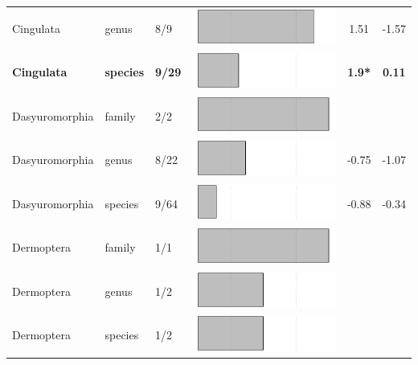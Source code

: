 \begin{longtable}{lL{1.8cm}C{2cm}lcc}
  Cingulata & genus & 8/9 & \includegraphics[width=0.20\linewidth, height=0.05\linewidth]{Results_1c/Table_figures/bar14.pdf} & 1.51 & -1.57 \\ 
  \textbf{Cingulata} & \textbf{species} & \textbf{9/29} & \includegraphics[width=0.20\linewidth, height=0.05\linewidth]{Results_1c/Table_figures/bar15.pdf} & \textbf{1.9*} & \textbf{0.11} \\ 
  Dasyuromorphia & family & 2/2 & \includegraphics[width=0.20\linewidth, height=0.05\linewidth]{Results_1c/Table_figures/bar16.pdf} &   &   \\ 
  Dasyuromorphia & genus & 8/22 & \includegraphics[width=0.20\linewidth, height=0.05\linewidth]{Results_1c/Table_figures/bar17.pdf} & -0.75 & -1.07 \\ 
  Dasyuromorphia & species & 9/64 & \includegraphics[width=0.20\linewidth, height=0.05\linewidth]{Results_1c/Table_figures/bar18.pdf} & -0.88 & -0.34 \\ 
  Dermoptera & family & 1/1 & \includegraphics[width=0.20\linewidth, height=0.05\linewidth]{Results_1c/Table_figures/bar19.pdf} &   &   \\ 
  Dermoptera & genus & 1/2 & \includegraphics[width=0.20\linewidth, height=0.05\linewidth]{Results_1c/Table_figures/bar20.pdf} &   &   \\ 
  Dermoptera & species & 1/2 & \includegraphics[width=0.20\linewidth, height=0.05\linewidth]{Results_1c/Table_figures/bar21.pdf} &   &   \\ 

\end{longtable}
